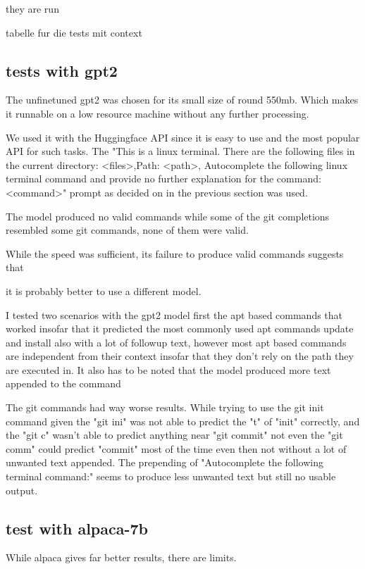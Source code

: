 they are run

tabelle fur die tests mit context
\pagebreak
\subsection{tests with gpt2}\raggedbottom

The unfinetuned gpt2 was chosen for its small size of round 550mb. Which makes it runnable on a low resource machine without any further processing. 

We used it with the Huggingface API since it is easy to use and the most popular API for such tasks. The "This is a linux terminal. There are the following files in the current  directory: <files>,Path: <path>, Autocomplete the following linux terminal command and provide no further explanation for the command: <command>" prompt as decided on in the previous section was used.


The model produced no valid commands while some of the git  completions resembled some git commands, none of them were valid.

While the speed was sufficient, its failure to produce valid commands suggests that

it is probably better to use a different model. 





I tested two scenarios with the gpt2 model first the apt based commands that worked insofar that it predicted the most commonly used apt commands update and install also with a lot of followup text, however most apt based commands are independent from their context insofar that they don't rely on the path they are executed in. It also has to be noted that the model produced more text appended to the command 


The git commands had way worse results. While trying to use the git  init command given the "git ini" was not able to predict the "t" of "init" correctly, and the "git c" wasn't able to predict anything near "git commit" not even  the "git comm" could predict "commit" most of the time even then not without a lot of unwanted text appended. The prepending of "Autocomplete the following terminal command:" seems to produce less unwanted text but still no usable output. 

\subsection{test with alpaca-7b}
While alpaca gives far better results, there are limits.



